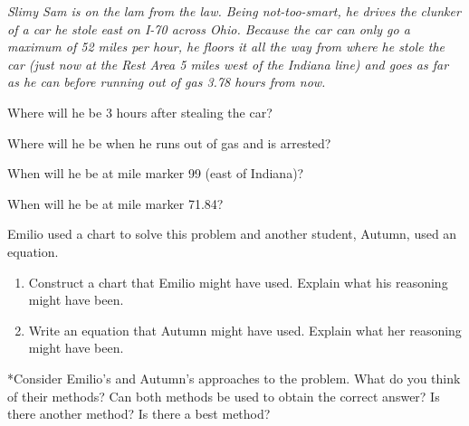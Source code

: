 \documentclass{ximera}
\begin{document}
\begin{problem}
\emph{Slimy Sam is on the lam from the law.  Being not-too-smart, he drives
the clunker of a car he stole east on I-70 across Ohio.  Because the
car can only go a maximum of 52 miles per hour, he floors it all the
way from where he stole the car (just now at the Rest Area 5 miles
west of the Indiana line) and goes as far as he can before running out
of gas 3.78 hours from now.}
\begin{enumerate}[label=(\roman*)]
 \item{Where will he be 3 hours after stealing the car?
 \item Where will he be when he runs out of gas and is arrested?
 \item  When will he be at mile marker 99 (east of Indiana)?
\item When will he be at mile marker 71.84?}
\end{enumerate}

Emilio used a chart to solve this problem and another student, Autumn, used an equation. 
\begin{enumerate}

\item Construct a chart that Emilio might have used.  Explain what his reasoning might have been.

\item Write an equation that Autumn might have used.   Explain what her reasoning might have been.

\end{enumerate}
*Consider Emilio's and Autumn's approaches to the problem.  What do you think of their methods?  Can both methods be used to obtain the correct answer?  Is there another method? Is there a best method? 
\end{problem}
\end{document}
